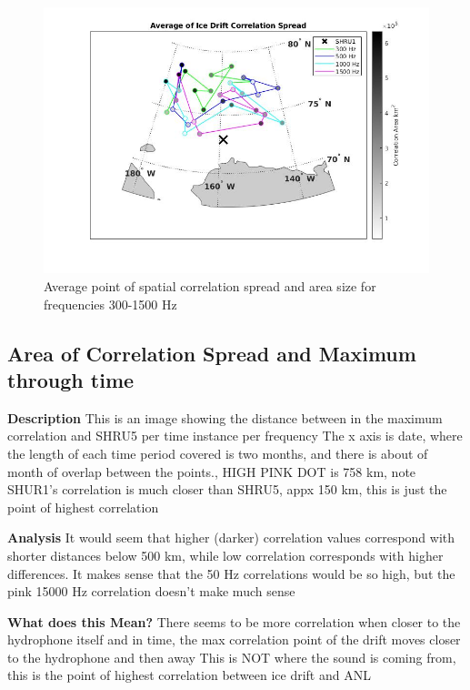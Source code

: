 \begin{figure}[h]
\centering
\includegraphics[scale=0.5]{Figures/avg_map_grayscale.jpg}
\caption{Average point of spatial correlation spread and area size for frequencies 300-1500 Hz}
\label{fig_maxcorr_location}
\end{figure}

\subsection{Area of Correlation Spread and Maximum  through time}
\textbf{Description}
This is an image showing the distance between in the maximum correlation and SHRU5 per time instance per frequency
The x axis is date, where the length of each time period covered is two months, and there is about of month of overlap between the points.,
HIGH PINK DOT is 758 km, note SHUR1’s correlation is much closer than SHRU5, appx 150 km, this is just the point of highest correlation

\textbf{Analysis}
It would seem that higher (darker) correlation values correspond with shorter distances below 500 km, while low correlation corresponds with higher differences.
It makes sense that the 50 Hz correlations would be so high, but the pink 15000 Hz correlation doesn’t make much sense

\textbf{What does this Mean?}
There seems to be more correlation when closer to the hydrophone itself and in time, the max correlation point of the drift moves closer to the hydrophone and then away
This is NOT where the sound is coming from, this is the point of highest correlation between ice drift and ANL

